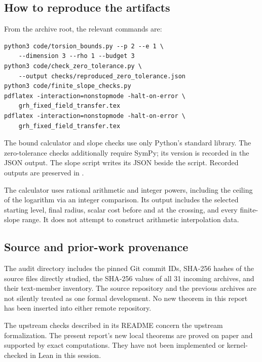 \subsection{How to reproduce the artifacts}
From the archive root, the relevant commands are:
\begin{verbatim}
python3 code/torsion_bounds.py --p 2 --e 1 \
    --dimension 3 --rho 1 --budget 3
python3 code/check_zero_tolerance.py \
    --output checks/reproduced_zero_tolerance.json
python3 code/finite_slope_checks.py
pdflatex -interaction=nonstopmode -halt-on-error \
    grh_fixed_field_transfer.tex
pdflatex -interaction=nonstopmode -halt-on-error \
    grh_fixed_field_transfer.tex
\end{verbatim}
The bound calculator and slope checks use only Python's standard library. The zero-tolerance checks additionally require SymPy; its version is recorded in the JSON output. The slope script writes its JSON beside the script. Recorded outputs are preserved in .

The calculator uses rational arithmetic and integer powers, including the ceiling of the logarithm via an integer comparison. Its output includes the selected starting level, final radius, scalar cost before and at the crossing, and every finite-slope range. It does not attempt to construct arithmetic interpolation data.

\subsection{Source and prior-work provenance}
The audit directory includes the pinned Git commit IDs, SHA-256 hashes of the source files directly studied, the SHA-256 values of all 31 incoming archives, and their text-member inventory. The source repository and the previous archives are not silently treated as one formal development. No new theorem in this report has been inserted into either remote repository.

The upstream checks described in its README concern the upstream formalization. The present report's new local theorems are proved on paper and supported by exact computations. They have not been implemented or kernel-checked in Lean in this session.

